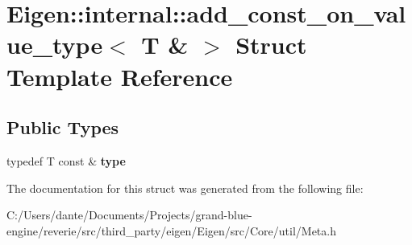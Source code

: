 \hypertarget{struct_eigen_1_1internal_1_1add__const__on__value__type_3_01_t_01_6_01_4}{}\section{Eigen\+::internal\+::add\+\_\+const\+\_\+on\+\_\+value\+\_\+type$<$ T \& $>$ Struct Template Reference}
\label{struct_eigen_1_1internal_1_1add__const__on__value__type_3_01_t_01_6_01_4}
\subsection*{Public Types}
\begin{DoxyCompactItemize}
\item 
\mbox{\label{struct_eigen_1_1internal_1_1add__const__on__value__type_3_01_t_01_6_01_4_a3a45336c12c506a624f49fef7cdb751c}} 
typedef T const  \& {\bfseries type}
\end{DoxyCompactItemize}


The documentation for this struct was generated from the following file\+:\begin{DoxyCompactItemize}
\item 
C\+:/\+Users/dante/\+Documents/\+Projects/grand-\/blue-\/engine/reverie/src/third\+\_\+party/eigen/\+Eigen/src/\+Core/util/Meta.\+h\end{DoxyCompactItemize}
